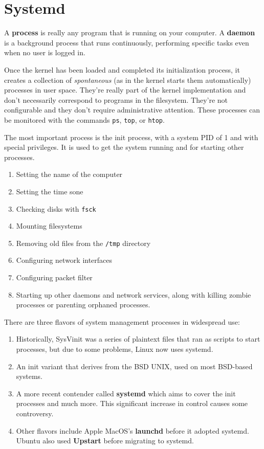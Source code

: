 \documentclass{article}
\theoremstyle{definition}
\begin{document}
\section{Systemd} 

  A \textbf{process} is really any program that is running on your computer. A \textbf{daemon} is a background process that runs continuously, performing specific tasks even when no user is logged in. 

  Once the kernel has been loaded and completed its initialization process, it creates a collection of \textit{spontaneous} (as in the kernel starts them automatically) processes in user space. They're really part of the kernel implementation and don't necessarily correspond to programs in the filesystem. They're not configurable and they don't require administrative attention. These processes can be monitored with the commands \texttt{ps}, \texttt{top}, or \texttt{htop}.

  The most important process is the init process, with a system PID of 1 and with special privileges. It is used to get the system running and for starting other processes. 

  \begin{enumerate}
    \item Setting the name of the computer 
    \item Setting the time sone 
    \item Checking disks with \texttt{fsck} 
    \item Mounting filesystems 
    \item Removing old files from the \texttt{/tmp} directory 
    \item Configuring network interfaces
    \item Configuring packet filter 
    \item Starting up other daemons and network services, along with killing zombie processes or parenting orphaned processes. 
  \end{enumerate}

  There are three flavors of system management processes in widespread use: 
  \begin{enumerate}
    \item Historically, SysVinit was a series of plaintext files that ran as scripts to start processes, but due to some problems, Linux now uses systemd.
    \item An init variant that derives from the BSD UNIX, used on most BSD-based systems. 
    \item A more recent contender called \textbf{systemd} which aims to cover the init processes and much more. This significant increase in control causes some controversy. 
    \item Other flavors include Apple MacOS's \textbf{launchd} before it adopted systemd. Ubuntu also used \textbf{Upstart} before migrating to systemd. 
  \end{enumerate}
\end{document}
